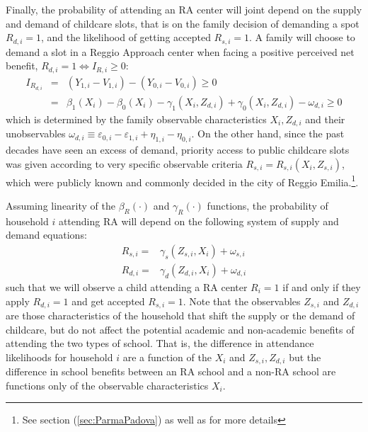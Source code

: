 \documentclass[12pt]{article}
\begin{document}
Finally, the probability of attending an RA center will joint depend on the supply and demand of childcare slots, that is on the family decision of demanding a spot $R_{d,i}=1$, and the likelihood of getting accepted $R_{s,i}=1$. 
A family will choose to demand a slot in a Reggio Approach center when facing a positive perceived net benefit, $R_{d,i}=1 \Leftrightarrow I_{R,i} \geq 0$:
\begin{eqnarray*}
I_{R_{d,i}} &=&\left(Y_{1,i}-V_{1,i}\right)-\left(Y_{0,i}-V_{0,i}\right) \geq 0 \\
&=&\beta_{1}(X_{i})-\beta_{0}(X_{i})-\gamma_{1}(X_{i},Z_{d,i})+\gamma_{0}(X_{i},Z_{d,i})-\omega_{d,i} \geq 0 
\end{eqnarray*}%
which is determined by the family observable characteristics $X_{i},Z_{d,i}$ and their unobservables $\omega_{d,i} \equiv \varepsilon_{0,i}-\varepsilon_{1,i}+\eta_{1,i}-\eta_{0,i}$. %
On the other hand, since the past decades have seen an excess of demand, priority access to public childcare slots was given according to very specific observable criteria $R_{s,i}=R_{s,i}(X_{i},Z_{s,i})$, which were publicly known and commonly decided in the city of Reggio Emilia.\footnote{See section (\ref{sec:ParmaPadova}) as well as \cite{Brilli2016} for more details}. %

Assuming linearity of the $\beta_{R}(\cdot)$ and $\gamma_{R}(\cdot)$ functions, the probability of household $i$ attending RA will depend on the following system of supply and demand equations:
%
\begin{align}
R_{s,i} = & \gamma_{s} \left( Z_{s,i}, X_{i} \right) + \omega_{s,i}  \label{eq:1stage-supply} \\
R_{d,i} = & \gamma_{d} \left( Z_{d,i}, X_{i} \right) + \omega_{d,i}  \label{eq:1stage-demand} 
%
\end{align}
%
such that we will observe a child attending a RA center $R_{i}=1$ if and only if they apply $R_{d,i}=1$ and get accepted $R_{s,i}=1$.
Note that the observables $Z_{s,i}$ and $Z_{d,i}$ are those characteristics of the household that shift the supply or the demand of childcare, but do not affect the potential academic and non-academic benefits of attending the two types of school. That is, the difference in attendance likelihoods for household $i$ are a function of the $X_{i}$ and $Z_{s,i},Z_{d,i}$ but the difference in school benefits between an RA school and a non-RA school are functions only of the observable characteristics $X_{i}$.
\end{document}

